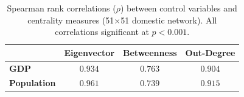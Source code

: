 \begin{table}[ht]
\centering
\caption{Spearman rank correlations ($\rho$) between control variables and centrality measures (51$\times$51 domestic network). All correlations significant at $p < 0.001$.}
\label{tab:rho_correlations}
\begin{tabular}{l c c c}
\hline
 & \textbf{Eigenvector} & \textbf{Betweenness} & \textbf{Out-Degree} \\
\hline
\textbf{GDP} & $0.934$ & $0.763$ & $0.904$ \\
\textbf{Population} & $0.961$ & $0.739$ & $0.915$ \\
\hline
\end{tabular}
\end{table}